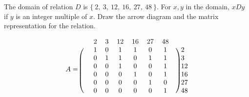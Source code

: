 \documentclass[]{exam}
\begin{document}
\begin{questions}

    \ifprintanswers
      \newpage
    \fi

    \question The domain of relation $D$ is $\{\ 2,\ 3,\ 12,\ 16,\ 27,\ 48\ \}$.
      For $x, y$ in the domain, $xDy$ if $y$ is an integer multiple of $x$. Draw
      the arrow diagram and the matrix representation for the relation.

      \begin{solution}
        \begin{center}
        \end{center}

        \[ A = 
          \begin{blockarray}{ccccccccc}
              &&  2 &  3 & 12 & 16 & 27 & 48 && \\
            \begin{block}{(cccccccc)c}
              &&  1 &  0 &  1 &  1 &  0 &  1 &&  2 \\
              &&  0 &  1 &  1 &  0 &  1 &  1 &&  3 \\
              &&  0 &  0 &  1 &  0 &  0 &  1 && 12 \\
              &&  0 &  0 &  0 &  1 &  0 &  1 && 16 \\
              &&  0 &  0 &  0 &  0 &  1 &  0 && 27 \\
              &&  0 &  0 &  0 &  0 &  0 &  1 && 48 \\
            \end{block}
          \end{blockarray}
        \]
      \end{solution}




\end{questions}
\end{document}
